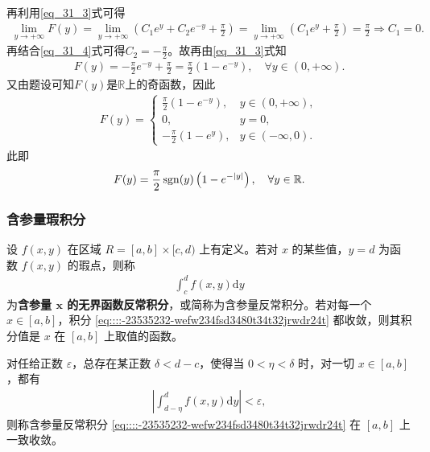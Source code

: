 \documentclass[../../main.tex]{subfiles}%
\begin{document}
\begin{solution}
\begin{enumerate}[(1)]
\begin{align*}
\end{align*}
再利用\eqref{eq_31_3}式可得
\begin{align*}
\lim\limits_{y\to+\infty}F(y)=\lim\limits_{y\to+\infty}\left(C_1e^y+C_2e^{-y}+\frac{\pi}{2}\right)=\lim\limits_{y\to+\infty}\left(C_1e^y+\frac{\pi}{2}\right)=\frac{\pi}{2}\Longrightarrow C_1=0.
\end{align*}
再结合\eqref{eq_31_4}式可得$C_2=-\frac{\pi}{2}$。故再由\eqref{eq_31_3}式知
\begin{align*}
F(y)=-\frac{\pi}{2}e^{-y}+\frac{\pi}{2}=\frac{\pi}{2}(1-e^{-y}),\quad \forall y\in(0,+\infty).
\end{align*}
又由题设可知$F(y)$是$\mathbb{R}$上的奇函数，因此
\begin{align*}
F(y)=
\begin{cases}
\frac{\pi}{2}(1-e^{-y}),&y\in(0,+\infty),\\
0,&y=0,\\
-\frac{\pi}{2}(1-e^y),&y\in(-\infty,0).
\end{cases}
\end{align*}
此即
\begin{align*}
F(y)=\frac{\pi}{2}\operatorname{sgn}(y)\left(1-e^{-|y|}\right),\quad \forall y\in\mathbb{R}.
\end{align*}
\end{enumerate}
\end{solution}






\subsubsection{含参量瑕积分}

\begin{definition}
设 \( f(x,y) \) 在区域 \( R = [a,b] \times [c,d) \) 上有定义。若对 \( x \) 的某些值，\( y = d \) 为函数 \( f(x,y) \) 的瑕点，则称
\begin{align}\label{eq::::-23535232-wefw234fsd3480t34t32jrwdr24t}
\int_{c}^{d} f(x,y) \mathrm{d}y
\end{align}
为\textbf{含参量 \( \boldsymbol{x} \) 的无界函数反常积分}，或简称为含参量反常积分。若对每一个 \( x \in [a,b] \)，积分 \eqref{eq::::-23535232-wefw234fsd3480t34t32jrwdr24t} 都收敛，则其积分值是 \( x \) 在 \( [a,b] \) 上取值的函数。
\end{definition}

\begin{definition}
对任给正数 \( \varepsilon \)，总存在某正数 \( \delta < d - c \)，使得当 \( 0 < \eta < \delta \) 时，对一切 \( x \in [a,b] \)，都有
\begin{align*}
\left| \int_{d - \eta}^{d} f(x,y) \mathrm{d}y \right| < \varepsilon,
\end{align*}
则称含参量反常积分 \eqref{eq::::-23535232-wefw234fsd3480t34t32jrwdr24t} 在 \( [a,b] \) 上一致收敛。
\end{definition}
\end{document}
